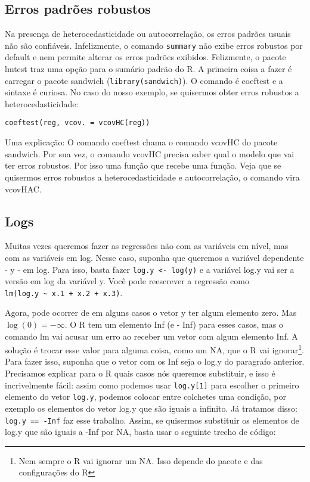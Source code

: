 \documentclass[]{book}
\let\rmarkdownfootnote\footnote%
\def\footnote{\protect\rmarkdownfootnote}
\begin{document}
\subsection{Erros padrões robustos}\label{erros-padroes-robustos}

Na presença de heterocedasticidade ou autocorrelação, os erros padrões
usuais não são confiáveis. Infelizmente, o comando \texttt{summary} não
exibe erros robustos por default e nem permite alterar os erros padrões
exibidos. Felizmente, o pacote lmtest traz uma opção para o sumário
padrão do R. A primeira coisa a fazer é carregar o pacote sandwich
(\texttt{library(sandwich)}). O comando é coeftest e a sintaxe é
curiosa. No caso do nosso exemplo, se quisermos obter erros robustos a
heterocedasticidade:

\begin{verbatim}
coeftest(reg, vcov. = vcovHC(reg))
\end{verbatim}

Uma explicação: O comando coeftest chama o comando vcovHC do pacote
sandwich. Por sua vez, o comando vcovHC precisa saber qual o modelo que
vai ter erros robustos. Por isso uma função que recebe uma função. Veja
que se quisermos erros robustos a heterocedasticidade e autocorrelação,
o comando vira vcovHAC.

\subsection{Logs}\label{logs}

Muitas vezes queremos fazer as regressões não com as variáveis em nível,
mas com as variáveis em log. Nesse caso, suponha que queremos a variável
dependente - y - em log. Para isso, basta fazer
\texttt{log.y\ \textless{}-\ log(y)} e a variável log.y vai ser a versão
em log da variável y. Você pode reescrever a regressão como
\texttt{lm(log.y\ \textasciitilde{}\ x.1\ +\ x.2\ +\ x.3)}.

Agora, pode ocorrer de em alguns casos o vetor y ter algum elemento
zero. Mas \(\log(0) = -\infty\). O R tem um elemento Inf (e - Inf) para
esses casos, mas o comando lm vai acusar um erro ao receber um vetor com
algum elemento Inf. A solução é trocar esse valor para alguma coisa,
como um NA, que o R vai ignorar\footnote{Nem sempre o R vai ignorar um
  NA. Isso depende do pacote e das configurações do R}. Para fazer isso,
suponha que o vetor com os Inf seja o log.y do paragrafo anterior.
Precisamos explicar para o R quais casos nós queremos substituir, e isso
é incrivelmente fácil: assim como podemos usar \texttt{log.y{[}1{]}}
para escolher o primeiro elemento do vetor \texttt{log.y}, podemos
colocar entre colchetes uma condição, por exemplo os elementos do vetor
log.y que são iguais a infinito. Já tratamos disso:
\texttt{log.y\ ==\ -Inf} faz esse trabalho. Assim, se quisermos
substituir os elementos de log.y que são iguais a -Inf por NA, basta
usar o seguinte trecho de código:
\end{document}
